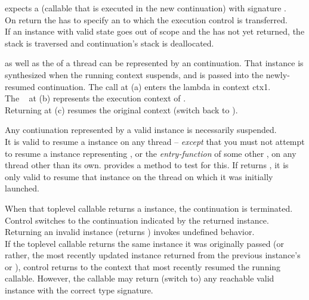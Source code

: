 
\call expects a \entryfn (callable that is executed in the new continuation)
with signature .\\

On return the \entryfn has to specify an \cont to which the execution control is
transferred.\\

If an instance with valid state goes out of scope and the \entryfn has not yet
returned, the stack is traversed  and continuation's stack is deallocated.\\


\label{subsec:data}

\label{subsec:main}

\main as well as the \entryfn of a thread can be represented by an continuation.
That \cont instance is synthesized when the running context suspends, and is
passed into the newly-resumed continuation.
The  call at (a) enters the lambda in context ctx1.\\
The \cont\  at (b) represents the execution context of \main.\\
Returning  at (c) resumes the original context (switch back to
\main).

Any contiunation represented by a valid \cont instance is necessarily suspended.\\
It is valid to resume a \cont instance on any thread -- \emph{except} that you
must not attempt to resume a \cont instance representing \main, or
the \emph{entry-function} of some other , on any thread other
than its own.
\cont provides a method to test for this.
If  returns , it is
only valid to resume that
\cont instance on the thread on which it was initially launched.


When that toplevel callable returns a \cont instance, the continuation is
terminated. Control switches to the continuation indicated by the returned \cont
instance.\\
Returning an invalid \cont instance (\opbool returns ) invokes
undefined behavior.\\
If the toplevel callable returns the same \cont instance it was originally
passed (or rather, the most recently updated instance returned from the
previous instance's \call or \resume), control returns to the context that most
recently resumed the running callable. However, the callable may return (switch
to) any reachable valid \cont instance with the correct type signature.


